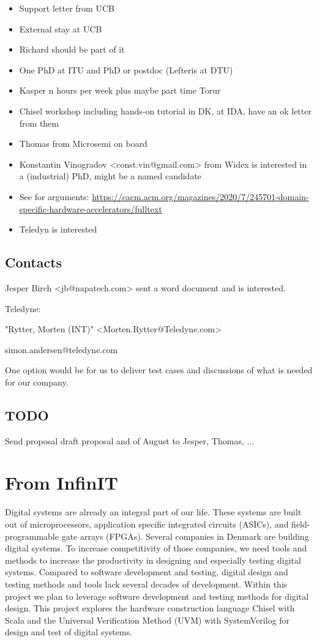 \documentclass[fleqn,12pt]{article}
\begin{document}
\begin{itemize}
\item Support letter from UCB
\item External stay at UCB
\item Richard should be part of it
\item One PhD at ITU and PhD or postdoc (Lefteris at DTU)
\item Kasper n hours per week plus maybe part time Torur
\item Chisel workshop including hands-on tutorial in DK, at IDA, have an ok letter from them
\item Thomas from Microsemi on board
\item Konstantin Vinogradov <const.vin@gmail.com> from Widex is interested in a (industrial) PhD, might be a named candidate
\item See for arguments: \url{https://cacm.acm.org/magazines/2020/7/245701-domain-specific-hardware-accelerators/fulltext}
\item Teledyn is interested
\end{itemize}

\subsection{Contacts}

Jesper Birch <jb@napatech.com> sent a word document and is interested.

Teledyne:

"Rytter, Morten (INT)" <Morten.Rytter@Teledyne.com>

simon.andersen@teledyne.com



One option would be for us to deliver test cases and discussions of what is needed for our company. 



\subsection{TODO}

Send proposal draft proposal and of August to Jesper, Thomas, ...

\section{From InfinIT}

Digital systems are already an integral part of our life. These systems are built out of microprocessors, application specific integrated circuits (ASICs), and field-programmable gate arrays (FPGAs). Several companies in Denmark are building digital systems. To increase competitivity of those companies, we need tools and methods to increase the productivity in designing and especially testing digital systems. Compared to software development and testing, digital design and testing methods and tools lack several decades of development. Within this project we plan to leverage software development and testing methods for digital design. This project explores the hardware construction language Chisel with Scala and the Universal Verification Method (UVM) with SystemVerilog for design and test of digital systems.
\end{document}
